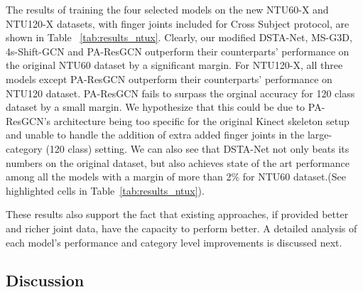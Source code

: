 \documentclass[sigconf,screen,prologue,table,dvipsnames]{acmart}
\begin{document}
The results of training the four selected models on the new NTU60-X and NTU120-X datasets, with finger joints included for Cross Subject protocol, are shown in Table ~\ref{tab:results_ntux}. Clearly, our modified DSTA-Net, MS-G3D, 4s-Shift-GCN and PA-ResGCN outperform their counterparts' performance on the original NTU60 dataset by a significant margin. For NTU120-X, all three models except PA-ResGCN outperform their counterparts' performance on NTU120 dataset. PA-ResGCN fails to surpass the orginal accuracy for 120 class dataset by a small margin. We hypothesize that this could be due to PA-ResGCN's architecture being too specific for the original Kinect skeleton setup and unable to handle the addition of extra added finger joints in the large-category (120 class) setting. We can also see that DSTA-Net not only beats its numbers on the original dataset, but also achieves state of the art performance among all the models with a margin of more than 2\% for NTU60 dataset.(See highlighted cells in Table~\ref{tab:results_ntux}). 

These results also support the fact that existing approaches, if provided better and richer joint data, have the capacity to perform better. A detailed analysis of each model's performance and category level improvements is discussed next.

\subsection{Discussion}
\label{subsec:discussion}
\end{document}
